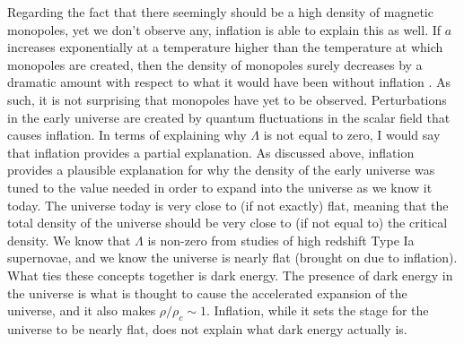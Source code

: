 \documentclass[aps,reprint,prl]{revtex4-1}
\begin{document}
\indent Regarding the fact that there seemingly should be a high density of magnetic monopoles, yet we don't observe any, inflation is able to explain this as well.  If $a$ increases exponentially at a temperature higher than the temperature at which monopoles are created, then the density of monopoles surely decreases by a dramatic amount with respect to what it would have been without inflation \cite{wiki:inflation}.  As such, it is not surprising that monopoles have yet to be observed.  Perturbations in the early universe are created by quantum fluctuations in the scalar field that causes inflation.  In terms of explaining why $\Lambda$ is not equal to zero, I would say that inflation provides a partial explanation.  As discussed above, inflation provides a plausible explanation for why the density of the early universe was tuned to the value needed in order to expand into the universe as we know it today.  The universe today is very close to (if not exactly) flat, meaning that the total density of the universe should be very close to (if not equal to) the critical density.  We know that $\Lambda$ is non-zero from studies of high redshift Type Ia supernovae, and we know the universe is nearly flat (brought on due to inflation).  What ties these concepts together is dark energy.  The presence of dark energy in the universe is what is thought to cause the accelerated expansion of the universe, and it also makes $\rho/\rho_c\sim 1$.  Inflation, while it sets the stage for the universe to be nearly flat, does not explain what dark energy actually is.


\end{document}
